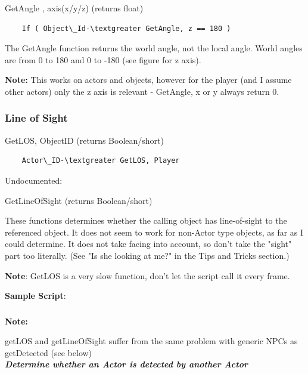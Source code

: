 

GetAngle , axis(x/y/z) (returns float)

\begin{lstlisting}
	If ( Object\_Id-\textgreater GetAngle, z == 180 )
\end{lstlisting}

The GetAngle function returns the world angle, not the local angle.
World angles are from 0 to 180 and 0 to -180 (see figure for z axis).

\textbf{Note:} This works on actors and objects, however for the player
(and I assume other actors) only the z axis is relevant - GetAngle, x or
y always return 0.


\hypertarget{line-of-sight}{%
\subsubsection{Line of Sight}\label{line-of-sight}}

GetLOS, ObjectID (returns Boolean/short)

\begin{lstlisting}
	Actor\_ID-\textgreater GetLOS, Player
\end{lstlisting}

Undocumented:

GetLineOfSight (returns Boolean/short)

These functions determines whether the calling object has line-of-sight
to the referenced object. It does not seem to work for non-Actor type
objects, as far as I could determine. It does not take facing into
account, so don't take the "sight" part too literally. (See "Is she
looking at me?" in the Tips and Tricks section.)

\textbf{Note}: GetLOS is a very slow function, don't let the script call
it every frame.

\textbf{Sample Script}:



\hypertarget{section-2}{%
\subsubsection{}\label{section-2}}

\textbf{Note:}

getLOS and getLineOfSight suffer from the same problem with generic NPCs
as getDetected (see below)\\
\protect\hypertarget{_Toc182634542}{}{}\emph{\textbf{Determine whether
an Actor is detected by another Actor}}

